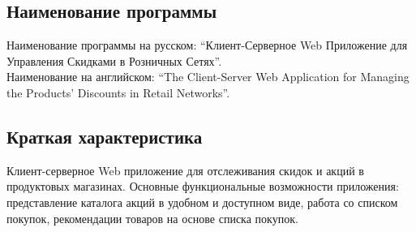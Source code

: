 \subsection{Наименование программы}
Наименование программы на русском: 
``Клиент-Серверное Web Приложение для Управления Скидками в Розничных Сетях''. \\
Наименование на английском: 
``The Client-Server Web Application for Managing the Products' Discounts in Retail Networks''. \\


\subsection{Краткая характеристика}
Клиент-серверное Web приложение для отслеживания скидок и акций в продуктовых
магазинах. Основные функциональные возможности приложения: представление
каталога акций в удобном и доступном виде, работа со списком покупок,
рекомендации товаров на основе списка покупок.
